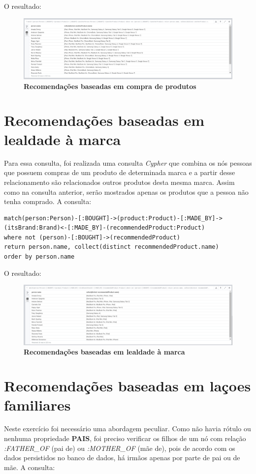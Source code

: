 \documentclass[a4paper, 12pt]{article}
\begin{document}
\begin{flushleft}
O resultado: 
\begin{figure}[H]
  \centering
  \includegraphics[width=1\textwidth]{2}
  \caption[2 - Recomendações baseadas em compra de produtos]{\textbf{Recomendações baseadas em compra de produtos}}
\end{figure} 

\section{Recomendações baseadas em lealdade à marca}
Para essa consulta, foi realizada uma consulta \emph{Cypher} que combina os nós pessoas que possuem compras de um produto de determinada marca e a partir desse relacionamento são relacionados outros produtos desta mesma marca. Assim como na consulta anterior, serão mostrados apenas os produtos que a pessoa não tenha comprado. A consulta: 

\begin{lstlisting}[frame=single]
match(person:Person)-[:BOUGHT]->(product:Product)-[:MADE_BY]->
(itsBrand:Brand)<-[:MADE_BY]-(recommendedProduct:Product)
where not (person)-[:BOUGHT]->(recommendedProduct)
return person.name, collect(distinct recommendedProduct.name)
order by person.name
\end{lstlisting} 

O resultado: 
\begin{figure}[H]
  \centering
  \includegraphics[width=1\textwidth]{3}
  \caption[3 - Recomendações baseadas em lealdade à marca]{\textbf{Recomendações baseadas em lealdade à marca}}
\end{figure}

\section{Recomendações baseadas em laçoes familiares}
Neste exercício foi necessário uma abordagem peculiar. Como não havia rótulo ou nenhuma propriedade \textbf{PAIS}, foi preciso verificar os filhos de um nó com relação \emph{ :FATHER\_OF} (pai de) ou\emph{ :MOTHER\_OF} (mãe de), pois de acordo com os dados persistidos no banco de dados, há irmãos apenas por parte de pai ou de mãe. A consulta: 


\end{flushleft}
\end{document}
